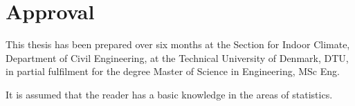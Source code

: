 \section*{Approval}
This thesis has been prepared over six months at the Section for Indoor Climate, Department of Civil Engineering, at the Technical University of Denmark, DTU, in partial fulfilment for the degree Master of Science in Engineering, MSc Eng.

It is assumed that the reader has a basic knowledge in the areas of statistics.

\vfill

\begin{center}
\namesigdate{\thesisauthor~-~\studentnumber}
\end{center}

\vfill
